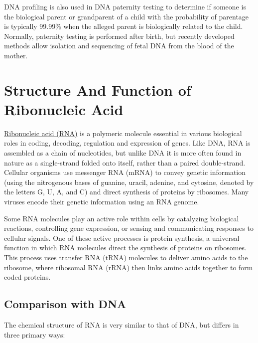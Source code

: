 DNA profiling is also used in DNA paternity testing to determine if someone is the biological parent or grandparent of a child with the probability of parentage is typically 99.99\% when the alleged parent is biologically related to the child. Normally, paternity testing is performed after birth, but recently developed methods allow isolation and sequencing of fetal DNA from the blood of the mother.

\hypertarget{structure-and-function-of-ribonucleic-acid}{%
\section{Structure And Function of Ribonucleic Acid}\label{structure-and-function-of-ribonucleic-acid}}

\href{https://en.wikipedia.org/wiki/RNA}{Ribonucleic acid (RNA)} is a polymeric molecule essential in various biological roles in coding, decoding, regulation and expression of genes. Like DNA, RNA is assembled as a chain of nucleotides, but unlike DNA it is more often found in nature as a single-strand folded onto itself, rather than a paired double-strand. Cellular organisms use messenger RNA (mRNA) to convey genetic information (using the nitrogenous bases of guanine, uracil, adenine, and cytosine, denoted by the letters G, U, A, and C) and direct synthesis of proteins by ribosomes. Many viruses encode their genetic information using an RNA genome.

Some RNA molecules play an active role within cells by catalyzing biological reactions, controlling gene expression, or sensing and communicating responses to cellular signals. One of these active processes is protein synthesis, a universal function in which RNA molecules direct the synthesis of proteins on ribosomes. This process uses transfer RNA (tRNA) molecules to deliver amino acids to the ribosome, where ribosomal RNA (rRNA) then links amino acids together to form coded proteins.

\hypertarget{comparison-with-dna}{%
\subsection{Comparison with DNA}\label{comparison-with-dna}}

The chemical structure of RNA is very similar to that of DNA, but differs in three primary ways:

